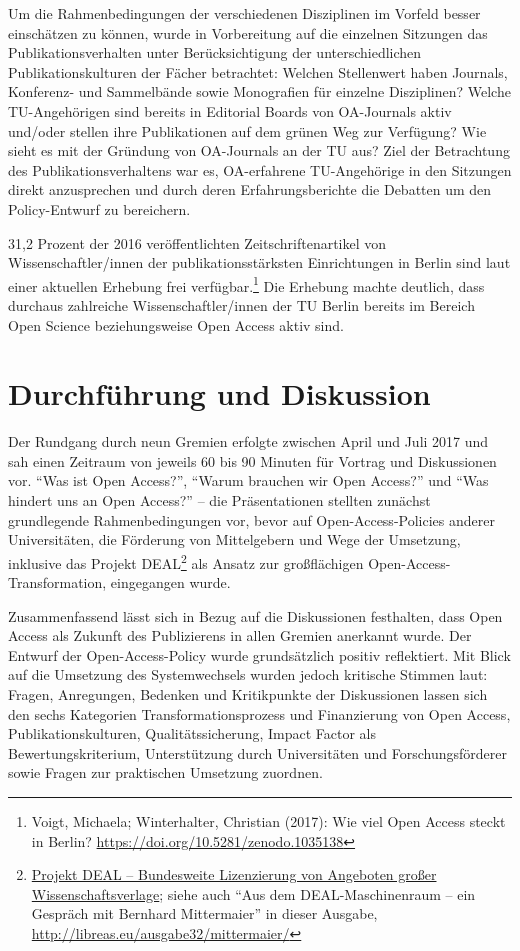 \documentclass[a4paper,
fontsize=11pt,
oneside,
numbers=noperiodatend,
parskip=half-,
bibliography=totoc,
final
]{scrartcl}
\begin{document}
Um die Rahmenbedingungen der verschiedenen Disziplinen im Vorfeld besser
einschätzen zu können, wurde in Vorbereitung auf die einzelnen Sitzungen
das Publikationsverhalten unter Berücksichtigung der unterschiedlichen
Publikationskulturen der Fächer betrachtet: Welchen Stellenwert haben
Journals, Konferenz- und Sammelbände sowie Monografien für einzelne
Disziplinen? Welche TU-Angehörigen sind bereits in Editorial Boards von
OA-Journals aktiv und/oder stellen ihre Publikationen auf dem grünen Weg
zur Verfügung? Wie sieht es mit der Gründung von OA-Journals an der TU
aus? Ziel der Betrachtung des Publikationsverhaltens war es,
OA-erfahrene TU-Angehörige in den Sitzungen direkt anzusprechen und
durch deren Erfahrungsberichte die Debatten um den Policy-Entwurf zu
bereichern.

31,2 Prozent der 2016 veröffentlichten Zeitschriftenartikel von
Wissenschaftler/innen der publikationsstärksten Einrichtungen in Berlin
sind laut einer aktuellen Erhebung frei verfügbar.\footnote{Voigt,
  Michaela; Winterhalter, Christian (2017): Wie viel Open Access steckt
  in Berlin? \url{https://doi.org/10.5281/zenodo.1035138}} Die Erhebung
machte deutlich, dass durchaus zahlreiche Wissenschaftler/innen der TU
Berlin bereits im Bereich Open Science beziehungsweise Open Access aktiv
sind.

\hypertarget{durchfuxfchrung-und-diskussion}{%
\section*{Durchführung und
Diskussion}\label{durchfuxfchrung-und-diskussion}}

Der Rundgang durch neun Gremien erfolgte zwischen April und Juli 2017
und sah einen Zeitraum von jeweils 60 bis 90 Minuten für Vortrag und
Diskussionen vor. \enquote{Was ist Open Access?}, \enquote{Warum
brauchen wir Open Access?} und \enquote{Was hindert uns an Open Access?}
-- die Präsentationen stellten zunächst grundlegende Rahmenbedingungen
vor, bevor auf Open-Access-Policies anderer Universitäten, die Förderung
von Mittelgebern und Wege der Umsetzung, inklusive das Projekt
DEAL\footnote{\href{https://www.projekt-deal.de/}{Projekt DEAL --
  Bundesweite Lizenzierung von Angeboten großer Wissenschaftsverlage};
  siehe auch \enquote{Aus dem DEAL-Maschinenraum -- ein Gespräch mit
  Bernhard Mittermaier} in dieser Ausgabe,
  \url{http://libreas.eu/ausgabe32/mittermaier/}} als Ansatz zur
großflächigen Open-Access-Transformation, eingegangen wurde.

Zusammenfassend lässt sich in Bezug auf die Diskussionen festhalten,
dass Open Access als Zukunft des Publizierens in allen Gremien anerkannt
wurde. Der Entwurf der Open-Access-Policy wurde grundsätzlich positiv
reflektiert. Mit Blick auf die Umsetzung des Systemwechsels wurden
jedoch kritische Stimmen laut: Fragen, Anregungen, Bedenken und
Kritikpunkte der Diskussionen lassen sich den sechs Kategorien
Transformationsprozess und Finanzierung von Open Access,
Publikationskulturen, Qualitätssicherung, Impact Factor als
Bewertungskriterium, Unterstützung durch Universitäten und
Forschungsförderer sowie Fragen zur praktischen Umsetzung zuordnen.
\end{document}
